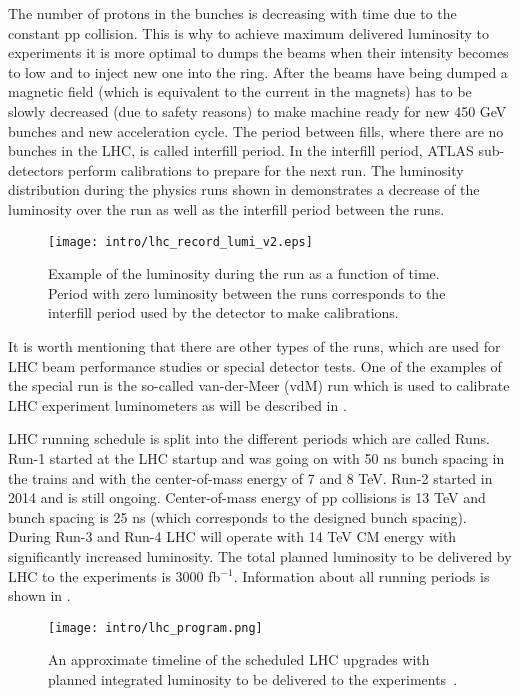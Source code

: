 The number of protons in the bunches is decreasing with time due to the constant pp collision.
This is why to achieve maximum delivered luminosity to experiments 
it is more optimal to dumps the beams when their intensity becomes to low and to inject new one into the ring.
After the beams have being dumped a magnetic field (which is equivalent to the current in the magnets) has to be slowly decreased (due to safety reasons) to make machine ready for new 450 GeV bunches and new acceleration cycle.
The period between fills, where there are no bunches in the LHC, is called interfill period. In the interfill period, ATLAS sub-detectors perform calibrations to prepare for the next run. 
The luminosity distribution during the physics runs shown in  demonstrates a decrease of the luminosity over the run as well as the interfill period between the runs. 

\begin{figure}[]
  \centering
\texttt{[image: intro/lhc\_record\_lumi\_v2.eps]}
\caption{Example of the luminosity during the run as a function of time. Period with zero luminosity between the runs corresponds to the interfill period used by the detector to make calibrations.}
\label{fig:interfill}
\end{figure}


It is worth mentioning that there are other types of the runs, which are used for LHC beam performance studies or special detector tests.
One of the examples of the special run is the so-called van-der-Meer (vdM) run which is used to calibrate LHC experiment luminometers as will be described in .

LHC running schedule is split into the different periods which are called Runs. Run-1 started at the LHC startup and was going on with 50 ns bunch spacing in the trains and with the center-of-mass energy of 7 and 8 TeV. 
Run-2 started in 2014 and is still ongoing. Center-of-mass energy of pp collisions is 13 TeV and bunch spacing is 25 ns (which corresponds to the designed bunch spacing).
During Run-3 and Run-4 LHC will operate with 14 TeV CM energy with significantly increased luminosity. The total planned luminosity to be delivered by LHC to the experiments is 3000 fb$^{-1}$.
Information about all running periods is shown in .

\begin{figure}[]
  \centering
\texttt{[image: intro/lhc\_program.png]}
\caption{An approximate timeline of the scheduled LHC upgrades with planned integrated luminosity to be delivered to the experiments~\cite{Kawamoto:1552862}.}
\label{fig:lhc_program}
\end{figure}


